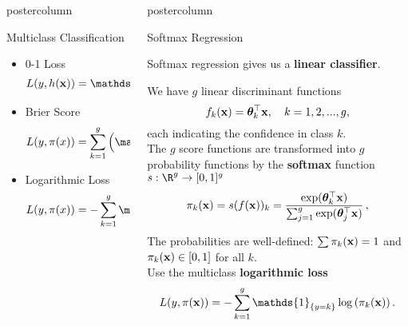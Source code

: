 \documentclass{beamer}
\newlength{\columnheight} %
\begin{document}
\begin{frame}[fragile]{}
\begin{columns}
\begin{column}{.31\textwidth}
\begin{beamercolorbox}[center]{postercolumn}
\begin{minipage}{.98\textwidth}
{\begin{myblock}{Multiclass Classification}
\begin{itemize}[$\bullet$] 
  \setlength{\itemindent}{+.3in}
  \item 0-1 Loss
  $$ L(y, \hx) = \mathds{1}_{\{y \neq \hx\}} $$
  \item Brier Score
  $$ L(y, \pi(x)) = \sum_{k = 1}^g \left(\mathds{1}_{\{y = k\}} - \pi_k(\xv)\right)^2 $$
  \item Logarithmic Loss
  $$ L(y, \pi(x)) = - \sum_{k = 1}^g \mathds{1}_{\{y = k\}} \log\left(\pi_k(\xv)\right) $$
\end{itemize}

\end{myblock}

				}
			\end{minipage}
		\end{beamercolorbox}
	\end{column}
	

\begin{column}{.31\textwidth}
\begin{beamercolorbox}[center]{postercolumn}
\begin{minipage}{.98\textwidth}
\parbox[t][\columnheight]{\textwidth}{

\begin{myblock}{Softmax Regression}

  Softmax regression gives us a \textbf{linear classifier}.

  We have $g$ linear discriminant functions
  $$
      f_k(\mathbf{x}) = \bm{\theta}_k^\top \mathbf{x}, \quad k = 1, 2, ..., g,
  $$
  each indicating the confidence in class $k$.\\

  The $g$ score functions are transformed into $g$ probability functions by the \textbf{softmax} function $s:\R^g \to [0,1]^g$ 
  $$
    \pi_k(\mathbf{x}) = s(f(\mathbf{x}))_k = \frac{\exp(\bm{\theta}_k^\top \mathbf{x})}{\sum_{j = 1}^g \exp(\bm{\theta}_j^\top \mathbf{x}) }\,,
  $$

  The probabilities are well-defined: $\sum \pi_k(\mathbf{x}) = 1$ and $\pi_k(\mathbf{x}) \in [0, 1]$ for all $k$.\\

  Use the multiclass \textbf{logarithmic loss}
  $$
    L(y, \pix) = - \sum_{k = 1}^g \mathds{1}_{\{y = k\}} \log\left(\pi_k(\xv)\right).
  $$ \\
  

\end{myblock}}
\end{minipage}
\end{beamercolorbox}
\end{column}
\end{columns}
\end{frame}
\end{document}
